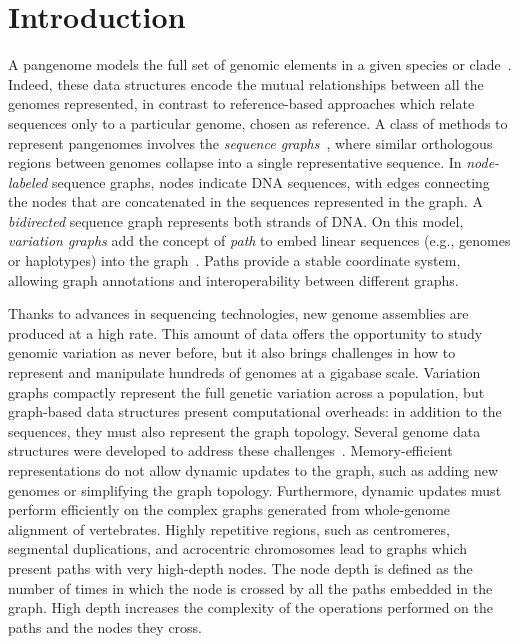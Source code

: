 \documentclass{bioinfo}
\begin{document}
    \section{Introduction}

    A pangenome models the full set of genomic elements in a given species or clade~\citep{32453966}. Indeed, these
    data structures encode the mutual relationships between all the genomes represented, in contrast to reference-based
    approaches which relate sequences only to a particular genome, chosen as reference. A class of methods to represent
    pangenomes involves the \textit{sequence graphs}~\citep{2488477}, where similar orthologous regions between genomes
    collapse into a single representative sequence. In \textit{node-labeled} sequence graphs, nodes indicate DNA
    sequences, with edges connecting the nodes that are concatenated in the sequences represented in the graph. A
    \textit{bidirected} sequence graph represents both strands of DNA. On this model, \textit{variation graphs} add the
    concept of \textit{path} to embed linear sequences (e.g., genomes or haplotypes) into the graph~\citep{30125266}.
    Paths provide a stable coordinate system, allowing graph annotations and interoperability between different graphs.

    Thanks to advances in sequencing technologies, new genome assemblies are produced at a high rate. This amount of
    data offers the opportunity to study genomic variation as never before, but it also brings challenges in how to
    represent and manipulate hundreds of genomes at a gigabase scale. Variation graphs compactly represent the full
    genetic variation across a population, but graph-based data structures present computational overheads: in addition
    to the sequences, they must also represent the graph topology. Several genome data structures were developed to
    address these challenges~\citep{33040146}. Memory-efficient representations do not allow dynamic updates to the
    graph, such as adding new genomes or simplifying the graph topology. Furthermore, dynamic updates must perform
    efficiently on the complex graphs generated from whole-genome alignment of vertebrates. Highly repetitive regions,
    such as centromeres, segmental duplications, and acrocentric chromosomes lead to graphs which present paths with
    very high-depth nodes. The node depth is defined as the number of times in which the node is crossed by all the
    paths embedded in the graph. High depth increases the complexity of the operations performed on the paths and the
    nodes they cross.
\end{document}
